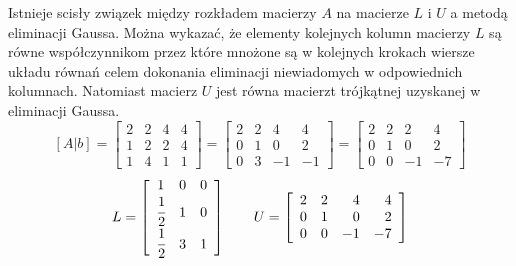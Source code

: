 \documentclass[a4paper,12pt]{article}
\begin{document}
Istnieje scisły związek między rozkładem macierzy $A$ na macierze $L$ i $U$ a metodą eliminacji Gaussa.
Można wykazać, że elementy kolejnych kolumn macierzy $L$ są równe współczynnikom przez które mnożone są w kolejnych krokach wiersze układu równań celem dokonania eliminacji niewiadomych w odpowiednich kolumnach. Natomiast macierz $U$ jest równa macierzt trójkątnej uzyskanej w eliminacji Gaussa.
$$[A|b] = \left[
        \begin{array}{ccrr}
         2 & 2 & 4 & 4\\
         1 & 2 & 2 & 4\\
         1 & 4 & 1 & 1		
         \end{array}
      \right]
 = \left[
       \begin{array}{ccrr}
          2 & 2 & 4 & 4\\
          0 & 1 & 0 & 2\\
          0 & 3 & -1 & -1
       \end{array}
     \right]
= \left[
	\begin{array}{ccrr}
	 2 & 2 & 2 & 4\\
	 0 & 1 & 0 & 2\\
	 0 & 0 & -1 & -7
	\end{array}
	\right]$$
$$ L = \left[
	\begin{array}{ccc}
	1 & 0 & 0 \\
	\cfrac{1}{2} & 1 & 0 \\
	\cfrac{1}{2} & 3 & 1
	\end{array}
	\right]
	\qquad
U = \left[
	\begin{array}{ccrr}
	2 & 2 & 4 & 4 \\
	0 & 1 & 0 & 2 \\
	0 & 0 & -1 & -7
	\end{array}
	\right]$$ 
 
\end{document}
